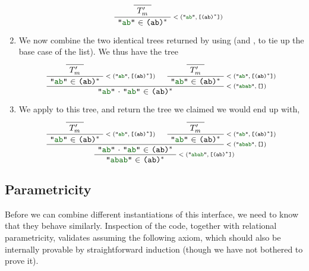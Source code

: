 \begin{enumerate}
\begin{enumerate}
            \[
              \AxiomC{}\UnaryInfC{$T'_m$}
              \RightLabel{\scriptsize\minparsetreeannot{\str{ab}}{\valuelist{\regex{(ab)$^*$}}}}
              \UnaryInfC{\str{ab} $\in$ \regex{(ab)$^*$}}
            \DisplayProof
            \]
        \end{enumerate}
      \item
        We now combine the two identical trees returned by  using  (and , to tie up the base case of the list).  We thus have the tree
        \[
          \AxiomC{}\UnaryInfC{$T'_m$}
          \RightLabel{\scriptsize\minparsetreeannot{\str{ab}}{\valuelist{\regex{(ab)$^*$}}}}
          \UnaryInfC{\str{ab} $\in$ \regex{(ab)$^*$}}
          \AxiomC{}\UnaryInfC{$T'_m$}
          \RightLabel{\scriptsize\minparsetreeannot{\str{ab}}{\valuelist{\regex{(ab)$^*$}}}}
          \UnaryInfC{\str{ab} $\in$ \regex{(ab)$^*$}}
          \RightLabel{\scriptsize\minparsetreeannot{\str{abab}}{\nil}}
          \BinaryInfC{\llstrcat{\str{ab}}{\str{ab}} $\in$ \regex{(ab)$^*$}}
        \DisplayProof
        \]
      \item
        We apply  to this tree, and return the tree we claimed we would end up with,
        \[
          \AxiomC{}\UnaryInfC{$T'_m$}
          \RightLabel{\scriptsize\minparsetreeannot{\str{ab}}{\valuelist{\regex{(ab)$^*$}}}}
          \UnaryInfC{\str{ab} $\in$ \regex{(ab)$^*$}}
          \AxiomC{}\UnaryInfC{$T'_m$}
          \RightLabel{\scriptsize\minparsetreeannot{\str{ab}}{\valuelist{\regex{(ab)$^*$}}}}
          \UnaryInfC{\str{ab} $\in$ \regex{(ab)$^*$}}
          \RightLabel{\scriptsize\minparsetreeannot{\str{abab}}{\nil}}
          \BinaryInfC{\llstrcat{\str{ab}}{\str{ab}} $\in$ \regex{(ab)$^*$}}
          \RightLabel{\scriptsize\minparsetreeannot{\str{abab}}{\valuelist{\regex{(ab)$^*$}}}}
          \UnaryInfC{\str{abab} $\in$ \regex{(ab)$^*$}}
        \DisplayProof
        \]
    \end{enumerate}

  \subsection{Parametricity} \label{sec:parser-extensionality-theorem}
    Before we can combine different instantiations of this interface, we need to know that they behave similarly.  Inspection of the code, together with relational parametricity, validates assuming the following axiom, which should also be internally provable by straightforward induction (though we have not bothered to prove it).

